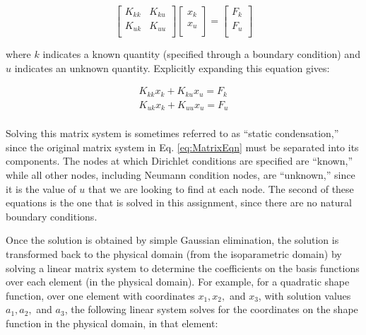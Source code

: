 \documentclass[10pt]{article}
\begin{document}
\begin{equation}
\label{eq:condensation}
\begin{bmatrix}
	K_{kk} & K_{ku}\\
	K_{uk} & K_{uu}\\
\end{bmatrix}
\begin{bmatrix}
	x_k\\
	x_u\\
\end{bmatrix}
=
\begin{bmatrix}
	F_k\\
	F_u\\
\end{bmatrix}
\end{equation}

where \(k\) indicates a known quantity (specified through a boundary condition) and \(u\) indicates an unknown quantity.   Explicitly expanding this equation gives:

\begin{equation}
\begin{aligned}
K_{kk}x_k+K_{ku}x_u=F_k\\
K_{uk}x_k+K_{uu}x_u=F_u\\
\end{aligned}
\end{equation}

Solving this matrix system is sometimes referred to as ``static condensation,'' since the original matrix system in Eq. \eqref{eq:MatrixEqn} must be separated into its components. The nodes at which Dirichlet conditions are specified are ``known,'' while all other nodes, including Neumann condition nodes, are ``unknown,'' since it is the value of \(u\) that we are looking to find at each node. The second of these equations is the one that is solved in this assignment, since there are no natural boundary conditions.

Once the solution is obtained by simple Gaussian elimination, the solution is transformed back to the physical domain (from the isoparametric domain) by solving a linear matrix system to determine the coefficients on the basis functions over each element (in the physical domain). For example, for a quadratic shape function, over one element with coordinates \(x_1, x_2,\) and \(x_3\), with solution values \(a_1, a_2,\) and \(a_3\), the following linear system solves for the coordinates on the shape function in the physical domain, in that element:
\end{document}
